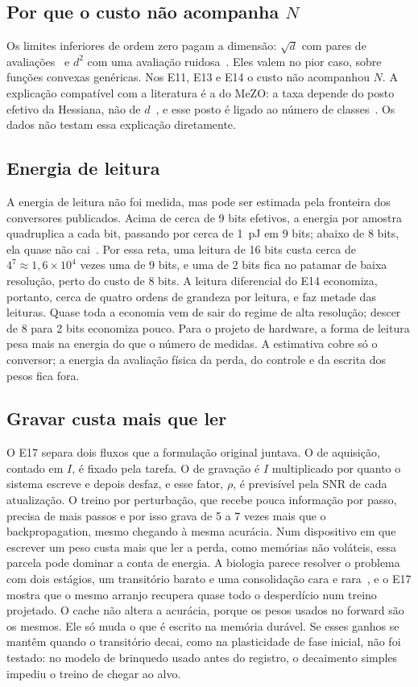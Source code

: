 \documentclass[journal]{IEEEtran}
\begin{document}
\subsection{Por que o custo não acompanha $N$}

Os limites inferiores de ordem zero pagam a dimensão: $\sqrt d$ com pares de avaliações~\cite{duchi2015} e $d^2$ com uma avaliação ruidosa~\cite{shamir2013}. Eles valem no pior caso, sobre funções convexas genéricas. Nos E11, E13 e E14 o custo não acompanhou $N$. A explicação compatível com a literatura é a do MeZO: a taxa depende do posto efetivo da Hessiana, não de $d$~\cite{malladi2023}, e esse posto é ligado ao número de classes~\cite{gurari2018}. Os dados não testam essa explicação diretamente.

\subsection{Energia de leitura}

A energia de leitura não foi medida, mas pode ser estimada pela fronteira dos conversores publicados. Acima de cerca de 9 bits efetivos, a energia por amostra quadruplica a cada bit, passando por cerca de 1~pJ em 9 bits; abaixo de 8 bits, ela quase não cai~\cite{jonsson2013}. Por essa reta, uma leitura de 16 bits custa cerca de $4^{7} \approx 1{,}6\times10^4$ vezes uma de 9 bits, e uma de 2 bits fica no patamar de baixa resolução, perto do custo de 8 bits. A leitura diferencial do E14 economiza, portanto, cerca de quatro ordens de grandeza por leitura, e faz metade das leituras. Quase toda a economia vem de sair do regime de alta resolução; descer de 8 para 2 bits economiza pouco. Para o projeto de hardware, a forma de leitura pesa mais na energia do que o número de medidas. A estimativa cobre só o conversor; a energia da avaliação física da perda, do controle e da escrita dos pesos fica fora.

\subsection{Gravar custa mais que ler}

O E17 separa dois fluxos que a formulação original juntava. O de aquisição, contado em $I$, é fixado pela tarefa. O de gravação é $I$ multiplicado por quanto o sistema escreve e depois desfaz, e esse fator, $\rho$, é previsível pela SNR de cada atualização. O treino por perturbação, que recebe pouca informação por passo, precisa de mais passos e por isso grava de 5 a 7 vezes mais que o backpropagation, mesmo chegando à mesma acurácia. Num dispositivo em que escrever um peso custa mais que ler a perda, como memórias não voláteis, essa parcela pode dominar a conta de energia. A biologia parece resolver o problema com dois estágios, um transitório barato e uma consolidação cara e rara~\cite{li2020}, e o E17 mostra que o mesmo arranjo recupera quase todo o desperdício num treino projetado. O cache não altera a acurácia, porque os pesos usados no forward são os mesmos. Ele só muda o que é escrito na memória durável. Se esses ganhos se mantêm quando o transitório decai, como na plasticidade de fase inicial, não foi testado: no modelo de brinquedo usado antes do registro, o decaimento simples impediu o treino de chegar ao alvo.
\end{document}
